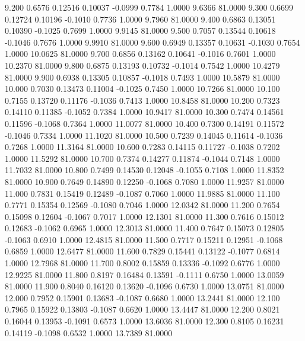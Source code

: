    9.200   0.6576   0.12516   0.10037  -0.0999   0.7784   1.0000   9.6366  81.0000
   9.300   0.6699   0.12724   0.10196  -0.1010   0.7736   1.0000   9.7960  81.0000
   9.400   0.6863   0.13051   0.10390  -0.1025   0.7699   1.0000   9.9145  81.0000
   9.500   0.7057   0.13544   0.10618  -0.1046   0.7676   1.0000   9.9910  81.0000
   9.600   0.6949   0.13357   0.10631  -0.1030   0.7654   1.0000  10.0625  81.0000
   9.700   0.6856   0.13162   0.10641  -0.1016   0.7601   1.0000  10.2370  81.0000
   9.800   0.6875   0.13193   0.10732  -0.1014   0.7542   1.0000  10.4279  81.0000
   9.900   0.6938   0.13305   0.10857  -0.1018   0.7493   1.0000  10.5879  81.0000
  10.000   0.7030   0.13473   0.11004  -0.1025   0.7450   1.0000  10.7266  81.0000
  10.100   0.7155   0.13720   0.11176  -0.1036   0.7413   1.0000  10.8458  81.0000
  10.200   0.7323   0.14110   0.11385  -0.1052   0.7384   1.0000  10.9417  81.0000
  10.300   0.7474   0.14561   0.11596  -0.1068   0.7364   1.0000  11.0077  81.0000
  10.400   0.7300   0.14191   0.11572  -0.1046   0.7334   1.0000  11.1020  81.0000
  10.500   0.7239   0.14045   0.11614  -0.1036   0.7268   1.0000  11.3164  81.0000
  10.600   0.7283   0.14115   0.11727  -0.1038   0.7202   1.0000  11.5292  81.0000
  10.700   0.7374   0.14277   0.11874  -0.1044   0.7148   1.0000  11.7032  81.0000
  10.800   0.7499   0.14530   0.12048  -0.1055   0.7108   1.0000  11.8352  81.0000
  10.900   0.7649   0.14890   0.12250  -0.1068   0.7080   1.0000  11.9257  81.0000
  11.000   0.7831   0.15419   0.12489  -0.1087   0.7060   1.0000  11.9885  81.0000
  11.100   0.7771   0.15354   0.12569  -0.1080   0.7046   1.0000  12.0342  81.0000
  11.200   0.7654   0.15098   0.12604  -0.1067   0.7017   1.0000  12.1301  81.0000
  11.300   0.7616   0.15012   0.12683  -0.1062   0.6965   1.0000  12.3013  81.0000
  11.400   0.7647   0.15073   0.12805  -0.1063   0.6910   1.0000  12.4815  81.0000
  11.500   0.7717   0.15211   0.12951  -0.1068   0.6859   1.0000  12.6477  81.0000
  11.600   0.7829   0.15441   0.13122  -0.1077   0.6814   1.0000  12.7968  81.0000
  11.700   0.8002   0.15859   0.13336  -0.1092   0.6776   1.0000  12.9225  81.0000
  11.800   0.8197   0.16484   0.13591  -0.1111   0.6750   1.0000  13.0059  81.0000
  11.900   0.8040   0.16120   0.13620  -0.1096   0.6730   1.0000  13.0751  81.0000
  12.000   0.7952   0.15901   0.13683  -0.1087   0.6680   1.0000  13.2441  81.0000
  12.100   0.7965   0.15922   0.13803  -0.1087   0.6620   1.0000  13.4447  81.0000
  12.200   0.8021   0.16044   0.13953  -0.1091   0.6573   1.0000  13.6036  81.0000
  12.300   0.8105   0.16231   0.14119  -0.1098   0.6532   1.0000  13.7389  81.0000
